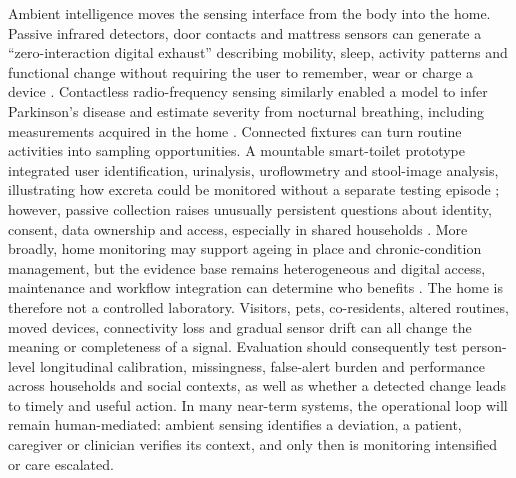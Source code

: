 Ambient intelligence moves the sensing interface from the body into the home. Passive infrared detectors, door contacts and mattress sensors can generate a ``zero-interaction digital exhaust'' describing mobility, sleep, activity patterns and functional change without requiring the user to remember, wear or charge a device \cite{Schutz2022DigitalExhaust}. Contactless radio-frequency sensing similarly enabled a model to infer Parkinson's disease and estimate severity from nocturnal breathing, including measurements acquired in the home \cite{Yang2022ParkinsonBreathing}. Connected fixtures can turn routine activities into sampling opportunities. A mountable smart-toilet prototype integrated user identification, urinalysis, uroflowmetry and stool-image analysis, illustrating how excreta could be monitored without a separate testing episode \cite{Park2020SmartToilet}; however, passive collection raises unusually persistent questions about identity, consent, data ownership and access, especially in shared households \cite{Ge2023SmartToilets}. More broadly, home monitoring may support ageing in place and chronic-condition management, but the evidence base remains heterogeneous and digital access, maintenance and workflow integration can determine who benefits \cite{Chen2023DigitalHealthAging,Facchinetti2023SmartHomes}. The home is therefore not a controlled laboratory. Visitors, pets, co-residents, altered routines, moved devices, connectivity loss and gradual sensor drift can all change the meaning or completeness of a signal. Evaluation should consequently test person-level longitudinal calibration, missingness, false-alert burden and performance across households and social contexts, as well as whether a detected change leads to timely and useful action. In many near-term systems, the operational loop will remain human-mediated: ambient sensing identifies a deviation, a patient, caregiver or clinician verifies its context, and only then is monitoring intensified or care escalated.

